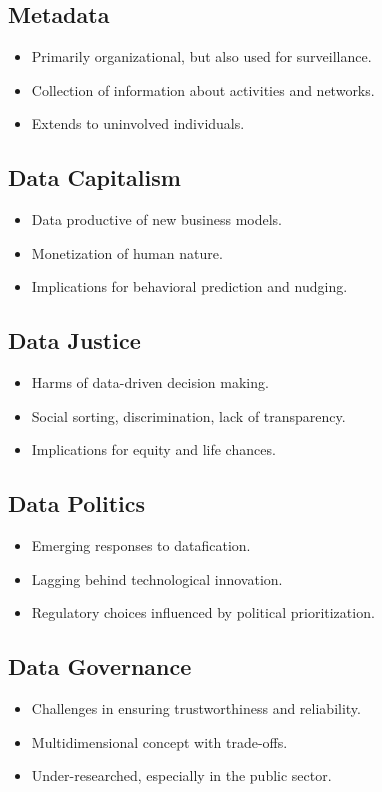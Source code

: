 \documentclass{article}
\begin{document}
\subsection*{Metadata}
\begin{itemize}
  \item Primarily organizational, but also used for surveillance.
  \item Collection of information about activities and networks.
  \item Extends to uninvolved individuals.
\end{itemize}

\subsection*{Data Capitalism}
\begin{itemize}
  \item Data productive of new business models.
  \item Monetization of human nature.
  \item Implications for behavioral prediction and nudging.
\end{itemize}

\subsection*{Data Justice}
\begin{itemize}
  \item Harms of data-driven decision making.
  \item Social sorting, discrimination, lack of transparency.
  \item Implications for equity and life chances.
\end{itemize}

\subsection*{Data Politics}
\begin{itemize}
  \item Emerging responses to datafication.
  \item Lagging behind technological innovation.
  \item Regulatory choices influenced by political prioritization.
\end{itemize}

\subsection*{Data Governance}
\begin{itemize}
  \item Challenges in ensuring trustworthiness and reliability.
  \item Multidimensional concept with trade-offs.
  \item Under-researched, especially in the public sector.
\end{itemize}
\end{document}
